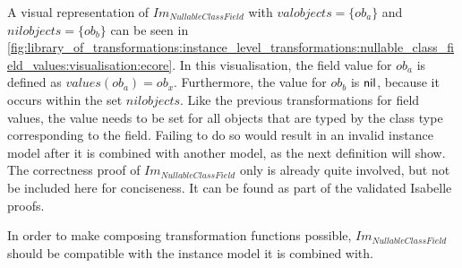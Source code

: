 A visual representation of $Im_{NullableClassField}$ with $valobjects = \{ob_a\}$ and $nilobjects = \{ob_b\}$ can be seen in \cref{fig:library_of_transformations:instance_level_transformations:nullable_class_field_values:visualisation:ecore}. In this visualisation, the field value for $ob_a$ is defined as $values(ob_a) = ob_x$. Furthermore, the value for $ob_b$ is $\mathsf{nil}$, because it occurs within the set $nilobjects$. Like the previous transformations for field values, the value needs to be set for all objects that are typed by the class type corresponding to the field. Failing to do so would result in an invalid instance model after it is combined with another model, as the next definition will show. The correctness proof of $Im_{NullableClassField}$ only is already quite involved, but not be included here for conciseness. It can be found as part of the validated Isabelle proofs.

In order to make composing transformation functions possible, $Im_{NullableClassField}$ should be compatible with the instance model it is combined with.

